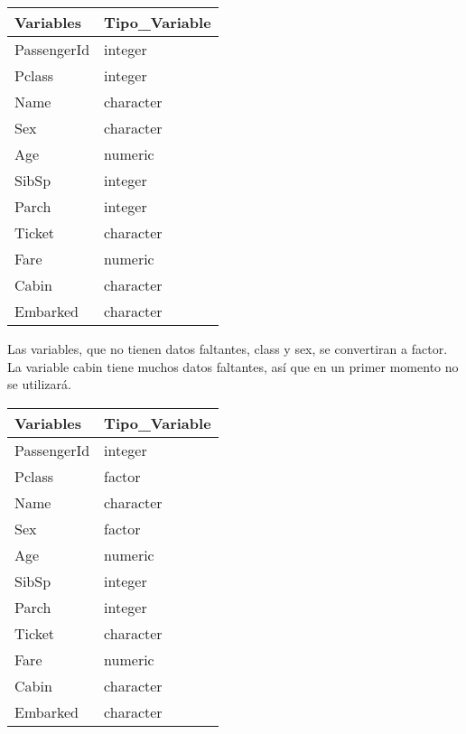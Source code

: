 \documentclass[]{article}
\newenvironment{Shaded}{\begin{snugshade}}{\end{snugshade}}
\newcommand{\KeywordTok}[1]{\textcolor[rgb]{0.13,0.29,0.53}{\textbf{#1}}}
\newcommand{\DataTypeTok}[1]{\textcolor[rgb]{0.13,0.29,0.53}{#1}}
\newcommand{\StringTok}[1]{\textcolor[rgb]{0.31,0.60,0.02}{#1}}
\newcommand{\CommentTok}[1]{\textcolor[rgb]{0.56,0.35,0.01}{\textit{#1}}}
\newcommand{\OperatorTok}[1]{\textcolor[rgb]{0.81,0.36,0.00}{\textbf{#1}}}
\newcommand{\NormalTok}[1]{#1}
\begin{document}
\begin{tabular}{l|l}
\hline
Variables & Tipo\_Variable\\
\hline
PassengerId & integer\\
\hline
Pclass & integer\\
\hline
Name & character\\
\hline
Sex & character\\
\hline
Age & numeric\\
\hline
SibSp & integer\\
\hline
Parch & integer\\
\hline
Ticket & character\\
\hline
Fare & numeric\\
\hline
Cabin & character\\
\hline
Embarked & character\\
\hline
\end{tabular}

Las variables, que no tienen datos faltantes, class y sex, se
convertiran a factor. La variable cabin tiene muchos datos faltantes,
así que en un primer momento no se utilizará.

\begin{Shaded}
\end{Shaded}

\begin{tabular}{l|l}
\hline
Variables & Tipo\_Variable\\
\hline
PassengerId & integer\\
\hline
Pclass & factor\\
\hline
Name & character\\
\hline
Sex & factor\\
\hline
Age & numeric\\
\hline
SibSp & integer\\
\hline
Parch & integer\\
\hline
Ticket & character\\
\hline
Fare & numeric\\
\hline
Cabin & character\\
\hline
Embarked & character\\
\hline
\end{tabular}
\end{document}
